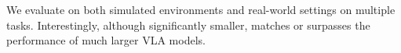 

We evaluate \ours on both simulated environments and real-world settings on multiple tasks. Interestingly, although significantly smaller, \ours matches or surpasses the performance of much larger VLA models.


